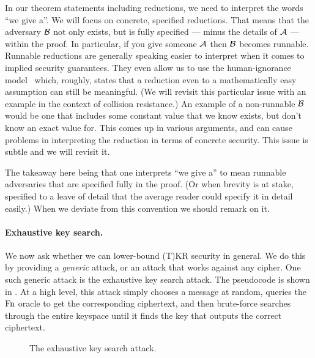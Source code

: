 In our theorem statements including reductions,  we need to interpret the words
``we give a''. We will focus on concrete, specified reductions. That means that
the adversary ${\mathcal B}$ not only exists, but is fully specified  --- minus the
details of ${\mathcal A}$ ---  within the proof.  In particular, if you give someone
${\mathcal A}$ then ${\mathcal B}$ becomes runnable.  Runnable reductions are generally
speaking easier to interpret when it comes to implied security guarantees. They
even allow us to use the human-ignorance model~\cite{rogaway2006formalizing}
which, roughly, states that a reduction even to a mathematically easy assumption
can still be meaningful. (We will revisit this particular issue with an example
in the context of collision resistance.)
An example of a non-runnable ${\mathcal B}$ would be one that includes some constant
value that we know exists, but don't know an exact value for. This comes up in
various arguments, and can cause problems in interpreting the reduction in terms
of concrete security.  This issue is subtle and we will revisit it.

The takeaway here being that one interprets ``we give a'' to mean runnable
adversaries that are specified fully in the proof. (Or when brevity is at stake,
specified to a leave of detail that the average reader could specify it in
detail easily.)  When we deviate from this convention we should remark on it.



\paragraph{Exhaustive key search.} We now ask whether we can lower-bound (T)KR security in general. We do this by providing a \textit{generic} attack, or an attack that works against any cipher. One such generic attack is the exhaustive key search attack. The pseudocode is shown in . At a high level, this attack simply chooses a message at random, queries the $\textnormal{Fn}$ oracle to get the corresponding ciphertext, and then brute-force searches through the entire keyspace until it finds the key that outputs the correct ciphertext.  
\begin{figure}[p]
	\centering
	\caption{The exhaustive key search attack.}
	\label{fig:eks}
\end{figure} 

